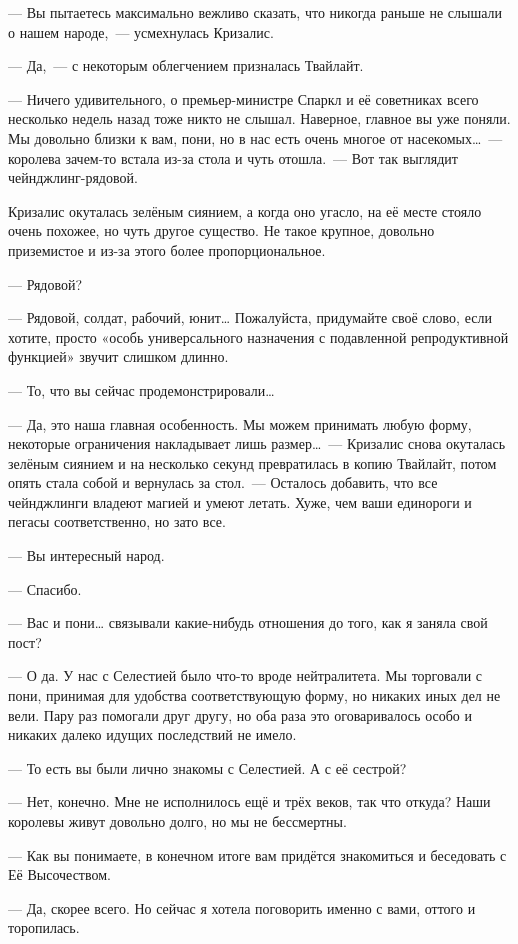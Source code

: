 \documentclass[twoside,a5paper,12pt]{extbook}
\begin{document}
— Вы пытаетесь максимально вежливо сказать, что никогда раньше не слышали о нашем народе, — усмехнулась Кризалис.

— Да, — с некоторым облегчением призналась Твайлайт.

— Ничего удивительного, о премьер-министре Спаркл и её советниках всего несколько недель назад тоже никто не слышал. Наверное, главное вы уже поняли. Мы довольно близки к вам, пони, но в нас есть очень многое от насекомых… — королева зачем-то встала из-за стола и чуть отошла. — Вот так выглядит чейнджлинг-рядовой.

Кризалис окуталась зелёным сиянием, а когда оно угасло, на её месте стояло очень похожее, но чуть другое существо. Не такое крупное, довольно приземистое и из-за этого более пропорциональное.

— Рядовой?

— Рядовой, солдат, рабочий, юнит… Пожалуйста, придумайте своё слово, если хотите, просто «особь универсального назначения с подавленной репродуктивной функцией» звучит слишком длинно.

— То, что вы сейчас продемонстрировали…

— Да, это наша главная особенность. Мы можем принимать любую форму, некоторые ограничения накладывает лишь размер… — Кризалис снова окуталась зелёным сиянием и на несколько секунд превратилась в копию Твайлайт, потом опять стала собой и вернулась за стол. — Осталось добавить, что все чейнджлинги владеют магией и умеют летать. Хуже, чем ваши единороги и пегасы соответственно, но зато все.

— Вы интересный народ.

— Спасибо.

— Вас и пони… связывали какие-нибудь отношения до того, как я заняла свой пост?

— О да. У нас с Селестией было что-то вроде нейтралитета. Мы торговали с пони, принимая для удобства соответствующую форму, но никаких иных дел не вели. Пару раз помогали друг другу, но оба раза это оговаривалось особо и никаких далеко идущих последствий не имело.

— То есть вы были лично знакомы с Селестией. А с её сестрой?

— Нет, конечно. Мне не исполнилось ещё и трёх веков, так что откуда? Наши королевы живут довольно долго, но мы не бессмертны.

— Как вы понимаете, в конечном итоге вам придётся знакомиться и беседовать с Её Высочеством.

— Да, скорее всего. Но сейчас я хотела поговорить именно с вами, оттого и торопилась.
\end{document}
